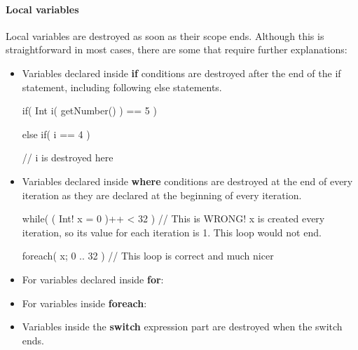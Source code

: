\paragraph{Local variables}
Local variables are destroyed as soon as their scope ends. Although this is straightforward in most cases, there are some that require further explanations:
\begin{itemize}
	\item Variables declared inside \textbf{if} conditions are destroyed after the end of the if statement, including following else statements.
	\begin{code}
if( Int i( getNumber() ) == 5 ) {
		
} else if( i == 4 ) {
	
} // i is destroyed here
	\end{code}

	\item Variables declared inside \textbf{where} conditions are destroyed at the end of every iteration as they are declared at the beginning of every iteration.
	\begin{code}
while( ( Int! x = 0 )++ < 32 ) {
	// This is WRONG! x is created every iteration, so its value for each iteration is 1. This loop would not end.
}

foreach( x; 0 .. 32 ) {
	// This loop is correct and much nicer
}
	\end{code}

	\item For variables declared inside \textbf{for}:

	\item For variables inside \textbf{foreach}:

	\item Variables inside the \textbf{switch} expression part are destroyed when the switch ends.
\end{itemize}


